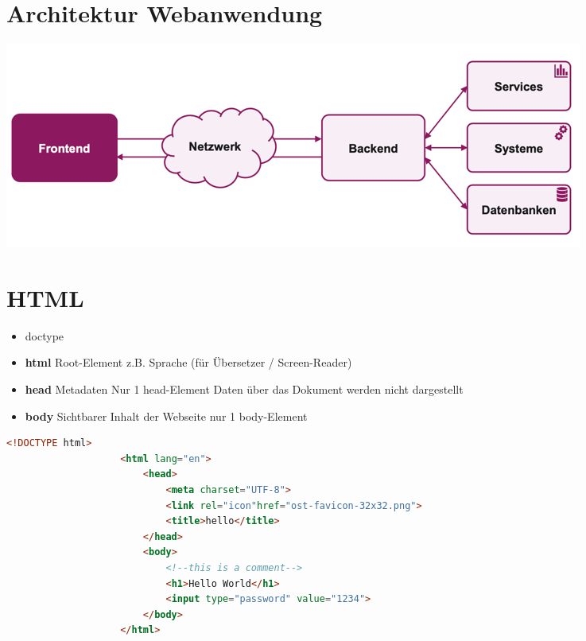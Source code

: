 \documentclass[a4paper, landscape, 8pt]{scrartcl}
\begin{document}
    \begin{multicols*}{4}
        \setlength{\columnseprule}{0pt}
        \footnotesize

        \section{Architektur Webanwendung}
        \includegraphics[width=\columnwidth]{graphic/32-architektur-webanwendung}

        \section{HTML}
        \begin{itemize}
            \item doctype
            \item \textbf{html} Root-Element
            \subitem z.B. Sprache (für Übersetzer / Screen-Reader)
            \item \textbf{head} Metadaten
            \subitem Nur 1 head-Element
            \subitem Daten über das Dokument
            \subitem werden nicht dargestellt
            \item \textbf{body} Sichtbarer Inhalt der Webseite
            \subitem nur 1 body-Element
        \end{itemize}

        \begin{lstlisting}[language=HTML]
                    <!DOCTYPE html>
                    <html lang="en">
                        <head>
                            <meta charset="UTF-8">
                            <link rel="icon"href="ost-favicon-32x32.png">
                            <title>hello</title>
                        </head>
                        <body>
                            <!--this is a comment-->
                            <h1>Hello World</h1>
                            <input type="password" value="1234">
                        </body>
                    </html>
        \end{lstlisting}


\end{multicols*}
\end{document}
